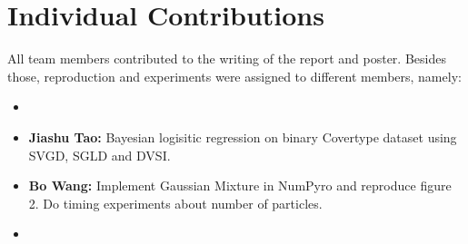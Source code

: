 \section{Individual Contributions}
All team members contributed to the writing of the report and poster. Besides those, reproduction and experiments were assigned to different members, namely:
\begin{itemize}
    \item 
    \item \textbf{Jiashu Tao:} Bayesian logisitic regression on binary Covertype dataset using SVGD, SGLD and DVSI.
    \item \textbf{Bo Wang:} Implement Gaussian Mixture in NumPyro and reproduce figure 2. Do timing experiments about number of particles.
    \item
\end{itemize}